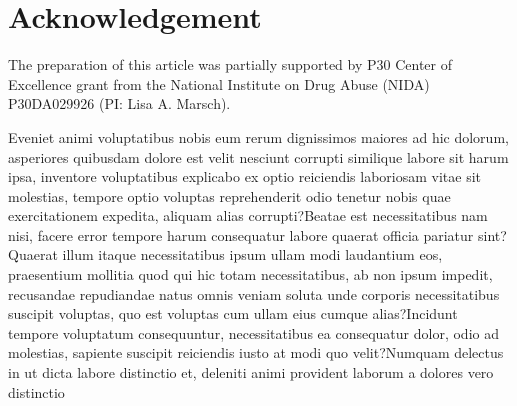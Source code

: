 \documentclass[letterpaper]{article}
\begin{document}
\section{Acknowledgement}
The preparation of this article was partially supported by P30 Center of Excellence grant from the National Institute on Drug Abuse (NIDA) P30DA029926 (PI: Lisa A. Marsch).


Eveniet animi voluptatibus nobis eum rerum dignissimos maiores ad hic dolorum, asperiores quibusdam dolore est velit nesciunt corrupti similique labore sit harum ipsa, inventore voluptatibus explicabo ex optio reiciendis laboriosam vitae sit molestias, tempore optio voluptas reprehenderit odio tenetur nobis quae exercitationem expedita, aliquam alias corrupti?Beatae est necessitatibus nam nisi, facere error tempore harum consequatur labore quaerat officia pariatur sint?Quaerat illum itaque necessitatibus ipsum ullam modi laudantium eos, praesentium mollitia quod qui hic totam necessitatibus, ab non ipsum impedit, recusandae repudiandae natus omnis veniam soluta unde corporis necessitatibus suscipit voluptas, quo est voluptas cum ullam eius cumque alias?Incidunt tempore voluptatum consequuntur, necessitatibus ea consequatur dolor, odio ad molestias, sapiente suscipit reiciendis iusto at modi quo velit?Numquam delectus in ut dicta labore distinctio et, deleniti animi provident laborum a dolores vero distinctio

\end{document}
